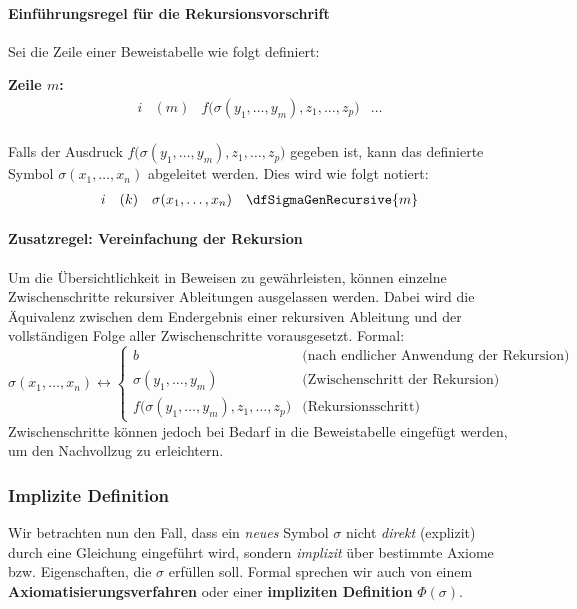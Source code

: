 \documentclass{book}
\theoremstyle{plain}
\theoremstyle{remark}
\theoremstyle{definition}
\begin{document}
\paragraph{Einführungsregel für die Rekursionsvorschrift}
Sei die Zeile einer Beweistabelle wie folgt definiert:

\textbf{Zeile \(m\):}
\[
\begin{array}{llll}
   i & (m) & f\big(\sigma(y_1, \ldots, y_m), z_1, \ldots, z_p\big) & \dots \\
\end{array}
\]

Falls der Ausdruck \(f\big(\sigma(y_1, \ldots, y_m), z_1, \ldots, z_p\big)\) gegeben ist, kann das definierte Symbol \(\sigma(x_1, \ldots, x_n)\) abgeleitet werden. Dies wird wie folgt notiert:
\[
\begin{array}{llll}
   i & (k) & \sigma(x_1, \ldots, x_n) & \dfSigmaGenRecursive{m} \\
\end{array}
\]

\paragraph{Zusatzregel: Vereinfachung der Rekursion}
Um die Übersichtlichkeit in Beweisen zu gewährleisten, können einzelne Zwischenschritte rekursiver Ableitungen ausgelassen werden. Dabei wird die Äquivalenz zwischen dem Endergebnis einer rekursiven Ableitung und der vollständigen Folge aller Zwischenschritte vorausgesetzt. Formal:
\[
\sigma(x_1, \ldots, x_n) \leftrightarrow 
\begin{cases} 
    b & \text{(nach endlicher Anwendung der Rekursion)} \\
    \sigma(y_1, \ldots, y_m) & \text{(Zwischenschritt der Rekursion)} \\
    f\big(\sigma(y_1, \ldots, y_m), z_1, \ldots, z_p\big) & \text{(Rekursionsschritt)}
\end{cases}
\]
Zwischenschritte können jedoch bei Bedarf in die Beweistabelle eingefügt werden, um den Nachvollzug zu erleichtern.


\subsubsection{Implizite Definition}
Wir betrachten nun den Fall, dass ein \emph{neues} Symbol \(\sigma\) nicht \emph{direkt} (explizit) durch eine Gleichung eingeführt wird, sondern \emph{implizit} über bestimmte Axiome bzw. Eigenschaften, die \(\sigma\) erfüllen soll. Formal sprechen wir auch von einem \textbf{Axiomatisierungsverfahren} oder einer \textbf{impliziten Definition} \(\Phi(\sigma)\).
\end{document}
